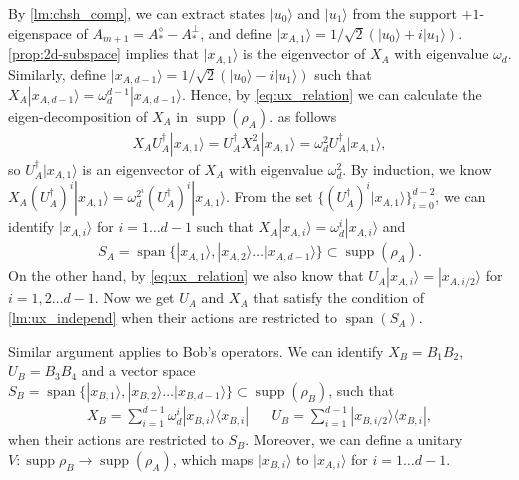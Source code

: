 \documentclass[11pt,letterpaper]{article}
\newcommand{\ket}[1]{|#1\rangle}
\newcommand{\ketbra}[2]{|#1\rangle\langle#2|}
\DeclareMathOperator{\spn}{span}
\DeclareMathOperator{\supp}{supp}
\newcommand{\1}{\mathbb{1}}
\theoremstyle{definition}
\begin{document}
By \cref{lm:chsh_comp}, we can extract states $\ket{u_0}$ and $\ket{u_1}$ from the support $+1$-eigenspace of 
$A_{m+1} = A_\ast^\diamond- A_\ast^\perp$,   
and define $\ket{x_{A,1}} = 1/\sqrt{2}(\ket{u_0} + i\ket{u_1})$. 
\cref{prop:2d-subspace} implies that $\ket{x_{A,1}}$ is the eigenvector of $X_A$ with eigenvalue $\omega_d$.
Similarly, define $\ket{x_{A,d-1}} = 1/\sqrt{2}(\ket{u_0} - i\ket{u_1})$ such that $X_A \ket{x_{A,d-1}} = \omega_d^{d-1}\ket{x_{A,d-1}}$.
Hence, by \cref{eq:ux_relation} we can calculate the eigen-decomposition of $X_A$ in $\supp(\rho_A)$.
as follows
\begin{align}
\label{eq:ladder}
 X_AU_A^\dagger \ket{x_{A,1}} = U_A^\dagger X_A^2 \ket{x_{A,1}} = \omega_d^2 U_A^\dagger \ket{x_{A,1}},
\end{align}
so $U_A^\dagger \ket{x_{A,1}}$ is an eigenvector of $X_A$ with eigenvalue $\omega_d^2$.
By induction, we know $X_A (U_A^\dagger)^i \ket{x_{A,1}} = \omega_d^{2^i} (U_A^\dagger)^i\ket{x_{A,1}}$. 
From the set $\{(U_A^\dagger)^i \ket{x_{A,1}}\}_{i=0}^{d-2}$, we can identify $\ket{x_{A,i}}$ for $i = 1 \dots  d-1$
such that $X_A \ket{x_{A,i}} = \omega_d^i \ket{x_{A,i}}$ and 
\begin{align}
S_A = \spn \{ \ket{x_{A,1}}, \ket{x_{A,2}} \dots  \ket{x_{A,d-1}} \} \subset \supp(\rho_A).
\end{align}
On the other hand, by \cref{eq:ux_relation} we also know that $U_A \ket{x_{A,i}} = \ket{x_{A,i/2}}$ for $i = 1,2 \dots d-1$.
Now we get $U_A$ and $X_A$ that satisfy the condition of \cref{lm:ux_independ} when their actions are 
restricted to $\spn(S_A)$.

Similar argument applies to Bob's operators. We can identify $X_B = B_1B_2$, 
$U_B=B_3B_4$ and a vector space $S_B =\spn\{ \ket{x_{B,1}}, \ket{x_{B,2}} \dots  \ket{x_{B,d-1}} \} \subset \supp(\rho_B)$,
such that 
\begin{align}
	X_B = \sum_{i=1}^{d-1} \omega_d^i \ketbra{x_{B,i}}{x_{B,i}} && U_B = \sum_{i=1}^{d-1} \ketbra{x_{B,i/2}}{x_{B,i}},
\end{align}
when their actions are restricted to $S_B$. Moreover, we can define a unitary $V: \supp{\rho_B} \to \supp(\rho_A)$,
which maps $\ket{x_{B,i}}$ to $\ket{x_{A,i}}$ for $i=1\dots d-1$.
\end{document}
